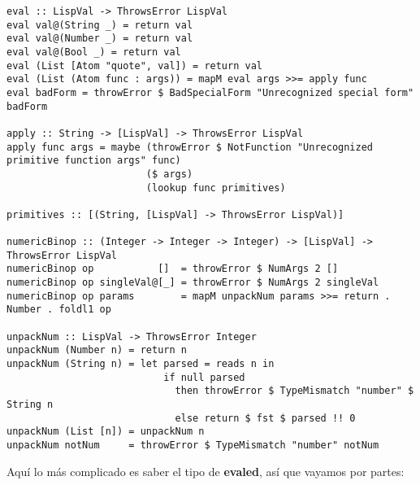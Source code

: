 \begin{minipage}{\linewidth}
\begin{tiny}
\begin{lstlisting}[frame=single]
eval :: LispVal -> ThrowsError LispVal
eval val@(String _) = return val
eval val@(Number _) = return val
eval val@(Bool _) = return val
eval (List [Atom "quote", val]) = return val
eval (List (Atom func : args)) = mapM eval args >>= apply func
eval badForm = throwError $ BadSpecialForm "Unrecognized special form" badForm

apply :: String -> [LispVal] -> ThrowsError LispVal
apply func args = maybe (throwError $ NotFunction "Unrecognized primitive function args" func)
                        ($ args)
                        (lookup func primitives)

primitives :: [(String, [LispVal] -> ThrowsError LispVal)]

numericBinop :: (Integer -> Integer -> Integer) -> [LispVal] -> ThrowsError LispVal
numericBinop op           []  = throwError $ NumArgs 2 []
numericBinop op singleVal@[_] = throwError $ NumArgs 2 singleVal
numericBinop op params        = mapM unpackNum params >>= return . Number . foldl1 op

unpackNum :: LispVal -> ThrowsError Integer
unpackNum (Number n) = return n
unpackNum (String n) = let parsed = reads n in 
                           if null parsed 
                             then throwError $ TypeMismatch "number" $ String n
                             else return $ fst $ parsed !! 0
unpackNum (List [n]) = unpackNum n
unpackNum notNum     = throwError $ TypeMismatch "number" notNum
\end{lstlisting}
\end{tiny}
\end{minipage}

Aqu\'i lo m\'as complicado es saber el tipo de \textbf{evaled}, as\'i que vayamos por partes:

